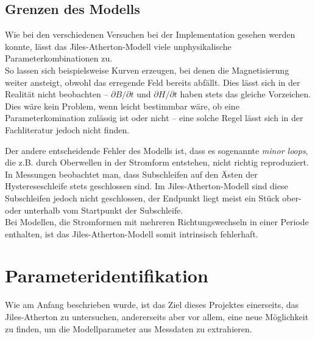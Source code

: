 \documentclass{scrartcl}
\begin{document}
\subsection{Grenzen des Modells}
Wie bei den verschiedenen Versuchen bei der Implementation gesehen werden konnte, lässt das Jiles-Atherton-Modell viele unphysikalische Parameterkombinationen zu.\\
So lassen sich beispielsweise Kurven erzeugen, bei denen die Magnetisierung weiter ansteigt, obwohl das erregende Feld bereits abfällt. Dies lässt sich in der Realität nicht beobachten -- $\partial B/\partial t$ und $\partial H/\partial t$ haben stets das gleiche Vorzeichen.\\
Dies wäre kein Problem, wenn leicht bestimmbar wäre, ob eine Parameterkomination zulässig ist oder nicht -- eine solche Regel lässt sich in der Fachliteratur jedoch nicht finden.\par
Der andere entscheidende Fehler des Modells ist, dass es sogenannte \emph{minor loops}, die z.B. durch Oberwellen in der Stromform entstehen, nicht richtig reproduziert. In Messungen beobachtet man, dass Subschleifen auf den Ästen der Hystereseschleife stets geschlossen sind. Im Jiles-Atherton-Modell sind diese Subschleifen jedoch nicht geschlossen, der Endpunkt liegt meist ein Stück ober- oder unterhalb vom Startpunkt der Subschleife.\\
Bei Modellen, die Stromformen mit mehreren Richtungswechseln in einer Periode enthalten, ist das Jiles-Atherton-Modell somit intrinsisch fehlerhaft.
\section{Parameteridentifikation}
Wie am Anfang beschrieben wurde, ist das Ziel dieses Projektes einerseits, das Jiles-Atherton zu untersuchen, andererseits aber vor allem, eine neue Möglichkeit zu finden, um die Modellparameter aus Messdaten zu extrahieren.
\end{document}
